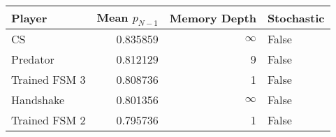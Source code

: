 \begin{tabular}{lrrl}
\toprule
        Player &  Mean $p_{N-1}$ &  Memory Depth & Stochastic \\
\midrule
            CS &        0.835859 &            \(\infty\) &      False \\
      Predator &        0.812129 &             9 &      False \\
 Trained FSM 3 &        0.808736 &             1 &      False \\
     Handshake &        0.801356 &            \(\infty\) &      False \\
 Trained FSM 2 &        0.795736 &             1 &      False \\
\bottomrule
\end{tabular}
